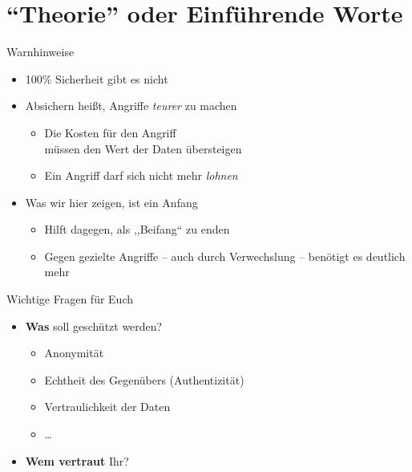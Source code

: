 \section{``Theorie'' oder Einführende Worte}
  \begin{frame}{Warnhinweise}
    \begin{itemize}
      \item 100\% Sicherheit gibt es nicht
      \item Absichern heißt, Angriffe \emph{teurer} zu machen
      \begin{itemize}
      \item Die Kosten für den Angriff\\ müssen den Wert der Daten übersteigen
      \item Ein Angriff darf sich nicht mehr \emph{lohnen}
      \end{itemize}
      \item Was wir hier zeigen, ist ein Anfang
      \begin{itemize}
        \item Hilft dagegen, als ,,Beifang`` zu enden
        \item Gegen gezielte Angriffe -- auch durch Verwechslung -- benötigt es deutlich mehr
      \end{itemize}
    \end{itemize}
  \end{frame}

  \begin{frame}{Wichtige Fragen für Euch}
    \begin{itemize}
      \item \textbf{Was} soll geschützt werden?
        \begin{itemize}
          \item Anonymität
          \item Echtheit des Gegenübers (Authentizität)
          \item Vertraulichkeit der Daten
          \item \ldots
        \end{itemize}
      \item \textbf{Wem vertraut} Ihr?
    \end{itemize}
  \end{frame}

